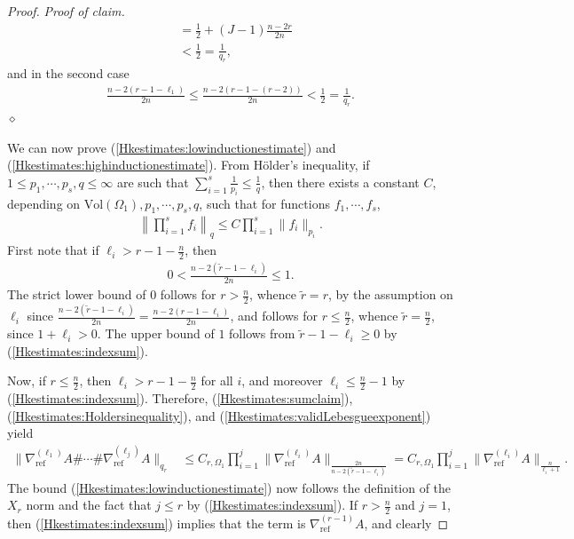 \documentclass[12pt]{amsart}
\renewcommand{\1}{{\mathbf 1}}
\newenvironment{claimproof}{\par\noindent\textit{Proof of claim.}\space}{\hfill$\diamond$\medskip\par}
\theoremstyle{others}
\numberwithin{equation}{section}
\begin{document}
\begin{proof}
\begin{claimproof}
\begin{align*}
         &= \frac{1}{2} + (J-1)\frac{n-2r}{2n} \\
         &< \frac{1}{2} = \frac{1}{q_r},
    \end{align*} and in the second case
    \begin{align*}
        \frac{n-2(r-1-\ell_1)}{2n} \leq \frac{n-2(r-1-(r-2))}{2n} < \frac{1}{2} = \frac{1}{q_r}.
    \end{align*}
    \end{claimproof}
    We can now prove (\ref{Hkestimates:lowinductionestimate}) and (\ref{Hkestimates:highinductionestimate}). From H{\"o}lder's inequality, if \(1 \leq p_1, \cdots, p_s, q \leq \infty\) are such that \(\sum_{i = 1}^s \frac{1}{p_i} \leq \frac{1}{q}\), then there exists a constant \(C\), depending on \(\text{Vol}(\Omega_1), p_1, \cdots, p_s, q\), such that for functions \(f_1, \cdots, f_s\),
    \begin{align}\label{Hkestimates:Holdersinequality}
        \left\|\prod_{i = 1}^s f_i\right\|_q \leq C\prod_{i = 1}^s\|f_i\|_{p_i}.
    \end{align} First note that if \(\ell_i > r - 1 - \frac{n}{2}\), then
    \begin{align}\label{Hkestimates:validLebesgueexponent}
        0 < \frac{n-2(\tilde{r}-1 - \ell_i)}{2n} \leq 1.
    \end{align} The strict lower bound of \(0\) follows for \(r > \frac{n}{2}\), whence \(\tilde{r} = r\), by the assumption on \(\ell_i\) since \(\frac{n-2(\tilde{r}-1 - \ell_i)}{2n} = \frac{n-2(r-1 - \ell_i)}{2n}\), and follows for \(r \leq \frac{n}{2}\), whence \(\tilde{r} = \frac{n}{2}\), since \(1 + \ell_i > 0\). The upper bound of \(1\) follows from \(\tilde{r} - 1 - \ell_i \geq 0\) by (\ref{Hkestimates:indexsum}). \par
    Now, if \(r \leq \frac{n}{2}\), then \(\ell_i > r - 1 - \frac{n}{2}\) for all \(i\), and moreover \(\ell_i \leq \frac{n}{2}-1\) by (\ref{Hkestimates:indexsum}). Therefore, (\ref{Hkestimates:sumclaim}), (\ref{Hkestimates:Holdersinequality}), and (\ref{Hkestimates:validLebesgueexponent}) yield
    \begin{align*}
        \|\nabla_{\text{ref}}^{(\ell_1)} A \# \cdots \# \nabla_{\text{ref}}^{(\ell_j)} A\|_{q_r} &\leq  C_{r, \Omega_1} \prod_{i=1}^j \|\nabla_{\text{ref}}^{(\ell_i)} A\|_{\frac{2n}{n-2(\tilde{r}-1-\ell_i)}} = C_{r,  \Omega_1} \prod_{i=1}^j \|\nabla_{\text{ref}}^{(\ell_i)} A\|_{\frac{n}{\ell_i+1}}.
    \end{align*} The bound (\ref{Hkestimates:lowinductionestimate}) now follows the definition of the \(X_r\) norm and the fact that \(j \leq r\) by (\ref{Hkestimates:indexsum}). If \(r > \frac{n}{2}\) and \(j = 1\), then (\ref{Hkestimates:indexsum}) implies that the term is \(\nabla_{\text{ref}}^{(r-1)} A\), and clearly

\end{proof}
\end{document}
